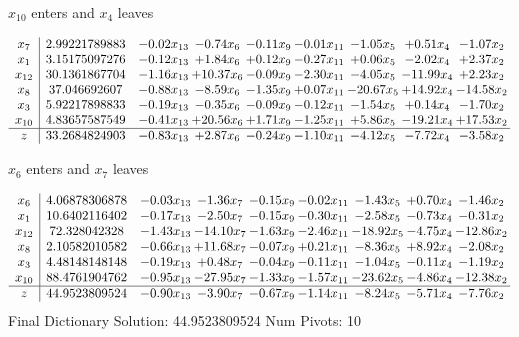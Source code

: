 \documentclass[9pt]{article}
\begin{document}
 $ x_{10} $ enters and $ x_{4} $ leaves 

 \[\begin{array}{c| c c@{\hskip 2pt} c@{\hskip 2pt} c@{\hskip 2pt} c@{\hskip 2pt} c@{\hskip 2pt} c@{\hskip 2pt} c@{\hskip 2pt} }
 x_{7}   &  2.99221789883 & -0.02 x_{13} & -0.74 x_{6} & -0.11 x_{9} & -0.01 x_{11} & -1.05 x_{5} & +  0.51 x_{4} & -1.07 x_{2}\\
 x_{1}   &  3.15175097276 & -0.12 x_{13} & +  1.84 x_{6} & +  0.12 x_{9} & -0.27 x_{11} & +  0.06 x_{5} & -2.02 x_{4} & +  2.37 x_{2}\\
 x_{12}   &  30.1361867704 & -1.16 x_{13} & + 10.37 x_{6} & -0.09 x_{9} & -2.30 x_{11} & -4.05 x_{5} & -11.99 x_{4} & +  2.23 x_{2}\\
 x_{8}   &  37.046692607 & -0.88 x_{13} & -8.59 x_{6} & -1.35 x_{9} & +  0.07 x_{11} & -20.67 x_{5} & + 14.92 x_{4} & -14.58 x_{2}\\
 x_{3}   &  5.92217898833 & -0.19 x_{13} & -0.35 x_{6} & -0.09 x_{9} & -0.12 x_{11} & -1.54 x_{5} & +  0.14 x_{4} & -1.70 x_{2}\\
 x_{10}   &  4.83657587549 & -0.41 x_{13} & + 20.56 x_{6} & +  1.71 x_{9} & -1.25 x_{11} & +  5.86 x_{5} & -19.21 x_{4} & + 17.53 x_{2}\\
\hline
z    &  33.2684824903 & -0.83 x_{13} & +  2.87 x_{6} & -0.24 x_{9} & -1.10 x_{11} & -4.12 x_{5} & -7.72 x_{4} & -3.58 x_{2}\\
\end{array}\]


 $ x_{6} $ enters and $ x_{7} $ leaves 

 \[\begin{array}{c| c c@{\hskip 2pt} c@{\hskip 2pt} c@{\hskip 2pt} c@{\hskip 2pt} c@{\hskip 2pt} c@{\hskip 2pt} c@{\hskip 2pt} }
 x_{6}   &  4.06878306878 & -0.03 x_{13} & -1.36 x_{7} & -0.15 x_{9} & -0.02 x_{11} & -1.43 x_{5} & +  0.70 x_{4} & -1.46 x_{2}\\
 x_{1}   &  10.6402116402 & -0.17 x_{13} & -2.50 x_{7} & -0.15 x_{9} & -0.30 x_{11} & -2.58 x_{5} & -0.73 x_{4} & -0.31 x_{2}\\
 x_{12}   &  72.328042328 & -1.43 x_{13} & -14.10 x_{7} & -1.63 x_{9} & -2.46 x_{11} & -18.92 x_{5} & -4.75 x_{4} & -12.86 x_{2}\\
 x_{8}   &  2.10582010582 & -0.66 x_{13} & + 11.68 x_{7} & -0.07 x_{9} & +  0.21 x_{11} & -8.36 x_{5} & +  8.92 x_{4} & -2.08 x_{2}\\
 x_{3}   &  4.48148148148 & -0.19 x_{13} & +  0.48 x_{7} & -0.04 x_{9} & -0.11 x_{11} & -1.04 x_{5} & -0.11 x_{4} & -1.19 x_{2}\\
 x_{10}   &  88.4761904762 & -0.95 x_{13} & -27.95 x_{7} & -1.33 x_{9} & -1.57 x_{11} & -23.62 x_{5} & -4.86 x_{4} & -12.38 x_{2}\\
\hline
z    &  44.9523809524 & -0.90 x_{13} & -3.90 x_{7} & -0.67 x_{9} & -1.14 x_{11} & -8.24 x_{5} & -5.71 x_{4} & -7.76 x_{2}\\
\end{array}\]
Final Dictionary
Solution:  44.9523809524
Num Pivots:  10
\end{document}
